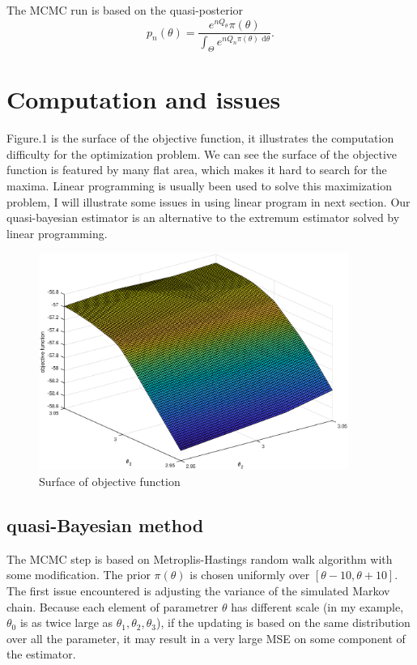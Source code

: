 \documentclass[12pt]{article}
\theoremstyle{plain} \newtheorem{theorem}{Theorem}
\theoremstyle{definition} \newtheorem{definition}{Definition}
\begin{document}
The MCMC run is based on the quasi-posterior
\begin{equation*}
    p_n(\theta) = \frac{e^{nQ_{\theta}}\pi(\theta)}{\int_{\Theta}e^{nQ_n\pi(\theta)\mbox{ d}\theta}}.
\end{equation*}

\section{Computation and issues}
\label{sec:computation-issues}

Figure.1 is the surface of the objective function, it illustrates the computation difficulty for the optimization problem. We can see the surface of the objective function is featured by many flat area, which makes it hard to search for the maxima. Linear programming is usually been used to solve this maximization problem, I will illustrate some issues in using linear program in next section. Our quasi-bayesian estimator is an alternative to the extremum estimator solved by linear programming.

\begin{figure}[h]
    \centering
    \includegraphics[width=0.9\textwidth]{figures/mesh.eps}
    \caption{Surface of objective function}
\end{figure}

\subsection{quasi-Bayesian method}
The MCMC step is based on Metroplis-Hastings random walk algorithm with some modification. The prior $\pi(\theta)$ is chosen uniformly over $[\theta-10, \theta+10]$.
The first issue encountered is adjusting the variance of the simulated Markov chain. Because each element of parametrer $\theta$ has different scale (in my example, $\theta_0$ is as twice large as $\theta_1,\theta_2,\theta_3$), if the updating is based on the same distribution over all the parameter, it may result in a very large MSE on some component of the estimator.
\end{document}
